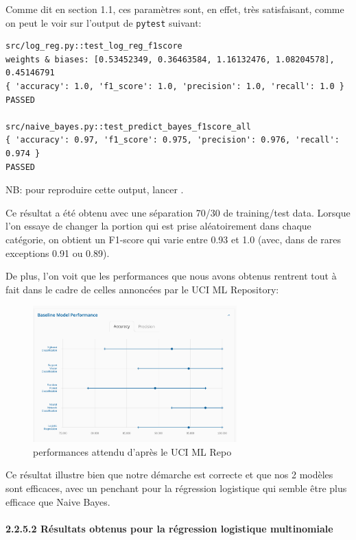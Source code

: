 \documentclass[
]{article}
\begin{document}
\vspace{0.3cm}

Comme dit en section 1.1, ces paramètres sont, en effet, très
satisfaisant, comme on peut le voir sur l'output de \texttt{pytest}
suivant:

\begin{lstlisting}
src/log_reg.py::test_log_reg_f1score 
weights & biases: [0.53452349, 0.36463584, 1.16132476, 1.08204578], 0.45146791  
{ 'accuracy': 1.0, 'f1_score': 1.0, 'precision': 1.0, 'recall': 1.0 }
PASSED

src/naive_bayes.py::test_predict_bayes_f1score_all  
{ 'accuracy': 0.97, 'f1_score': 0.975, 'precision': 0.976, 'recall': 0.974 }
PASSED
\end{lstlisting}

NB: pour reproduire cette output, lancer .

Ce résultat a été obtenu avec une séparation 70/30 de training/test
data. Lorsque l'on essaye de changer la portion qui est prise
aléatoirement dans chaque catégorie, on obtient un F1-score qui varie
entre 0.93 et 1.0 (avec, dans de rares exceptions 0.91 ou 0.89).

De plus, l'on voit que les performances que nous avons obtenus rentrent
tout à fait dans le cadre de celles annoncées par le UCI ML Repository:

\begin{figure}
\centering
\includegraphics[width=0.7\textwidth,height=\textheight]{../res/screenshot_ucmi_perfs.png}
\caption{performances attendu d'après le UCI ML Repo \cite{IrisWebsite}}
\end{figure}

Ce résultat illustre bien que notre démarche est correcte et que nos 2
modèles sont efficaces, avec un penchant pour la régression logistique
qui semble être plus efficace que Naive Bayes.

\hypertarget{ruxe9sultats-obtenus-pour-la-ruxe9gression-logistique-multinomiale}{%
\paragraph{2.2.5.2 Résultats obtenus pour la régression logistique
multinomiale}\label{ruxe9sultats-obtenus-pour-la-ruxe9gression-logistique-multinomiale}}
\end{document}
